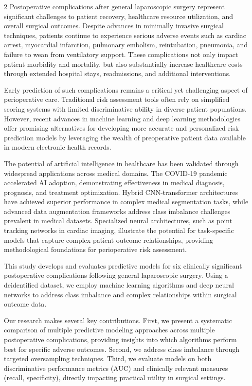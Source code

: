 \documentclass[bst/sn-nature]{sn-jnl}
\begin{document}
\begin{multicols}{2}
\quad Postoperative complications after general laparoscopic surgery represent significant challenges to patient recovery, healthcare resource utilization, and overall surgical outcomes. Despite advances in minimally invasive surgical techniques, patients continue to experience serious adverse events such as cardiac arrest, myocardial infarction, pulmonary embolism, reintubation, pneumonia, and failure to wean from ventilatory support. These complications not only impact patient morbidity and mortality, but also substantially increase healthcare costs through extended hospital stays, readmissions, and additional interventions\cite{challenges3}.

Early prediction of such complications remains a critical yet challenging aspect of perioperative care. Traditional risk assessment tools often rely on simplified scoring systems with limited discriminative ability in diverse patient populations\cite{challenges1}\cite{challenges2}. However, recent advances in machine learning and deep learning methodologies offer promising alternatives for developing more accurate and personalized risk prediction models by leveraging the wealth of preoperative patient data available in modern electronic health records\cite{promises1}\cite{promises2}\cite{promises3}.

The potential of artificial intelligence in healthcare has been validated through widespread applications across medical domains. The COVID-19 pandemic accelerated AI adoption, demonstrating effectiveness in medical diagnosis, prognosis, and treatment optimization\cite{covid_ai_survey}. Hybrid CNN-transformer architectures have achieved superior performance in complex medical segmentation tasks\cite{hybrid_cnn_transformer}, while advanced data augmentation frameworks address class imbalance challenges prevalent in medical datasets\cite{medical_augmentation}. Specialized neural architectures, such as point tracking networks in cardiac imaging\cite{manet_cardiac}, illustrate the potential for task-specific models that capture complex patient-outcome relationships, providing methodological foundations for perioperative risk assessment.

This study develops and evaluates predictive models for six clinically significant postoperative complications following general laparoscopic surgery. Using a deidentified dataset, we employ machine learning algorithms and deep neural networks to address class imbalance and complex relationships within surgical outcome data.

Our research makes several key contributions. First, we present a systematic comparison of multiple predictive modeling approaches across multiple postoperative complications, providing insights into which algorithms perform best for specific adverse outcomes. Second, we address class imbalance through targeted oversampling techniques. Third, we evaluate models on both discriminative performance metrics (AUC) and clinically relevant measures (recall, specificity), directly impacting practical utility in surgical settings.


\end{multicols}
\end{document}
